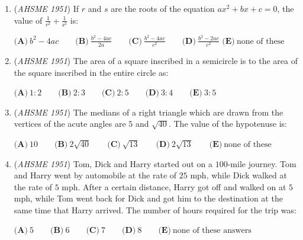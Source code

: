 \begin{enumerate}
	\item (\textit{AHSME 1951}) If $r$ and $s$ are the roots of the equation $ax^2+bx+c=0$, the value of $\frac{1}{r^{2}}+\frac{1}{s^{2}}$ is:


 $\textbf{(A)}\ b^{2}-4ac\qquad\textbf{(B)}\ \frac{b^{2}-4ac}{2a}\qquad\textbf{(C)}\ \frac{b^{2}-4ac}{c^{2}}\qquad\textbf{(D)}\ \frac{b^{2}-2ac}{c^{2}}$
$\textbf{(E)}\ \text{none of these}$


	\item (\textit{AHSME 1951}) The area of a square inscribed in a semicircle is to the area of the square inscribed in the entire circle as: 


 $\textbf{(A)}\ 1: 2\qquad\textbf{(B)}\ 2: 3\qquad\textbf{(C)}\ 2: 5\qquad\textbf{(D)}\ 3: 4\qquad\textbf{(E)}\ 3: 5$


	\item (\textit{AHSME 1951}) The medians of a right triangle which are drawn from the vertices of the acute angles are $5$ and $\sqrt{40}$. The value of the hypotenuse is:


 $\textbf{(A)}\ 10\qquad\textbf{(B)}\ 2\sqrt{40}\qquad\textbf{(C)}\ \sqrt{13}\qquad\textbf{(D)}\ 2\sqrt{13}\qquad\textbf{(E)}\ \text{none of these}$


	\item (\textit{AHSME 1951}) Tom, Dick and Harry started out on a $100$-mile journey. Tom and Harry went by automobile at the rate of $25$ mph, while Dick walked at the rate of $5$ mph. After a certain distance, Harry got off and walked on at $5$ mph, while Tom went back for Dick and got him to the destination at the same time that Harry arrived. The number of hours required for the trip was: 


 $\textbf{(A)}\ 5\qquad\textbf{(B)}\ 6\qquad\textbf{(C)}\ 7\qquad\textbf{(D)}\ 8\qquad\textbf{(E)}\ \text{none of these answers}$


\end{enumerate}